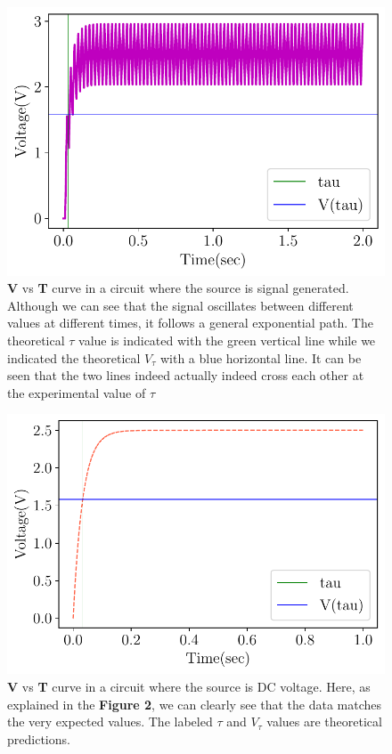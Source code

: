 \documentclass[twocolumn]{article}\usepackage[english]{babel}
\begin{document}
\begin{figure}
\includegraphics[width=\linewidth]{images/v2/Signal_Generated_RC_Circuit_Plot.pdf}
\caption{\textbf{V} vs \textbf{T} curve in a circuit where the source is signal generated. Although we can see that the signal oscillates between different values at different times, it follows a general exponential path. The theoretical $\tau$ value is indicated with the green vertical line while we indicated the theoretical $V_\tau$ with a blue horizontal line. It can be seen that the two lines indeed actually indeed cross each other at the experimental value of $\tau$}
  \label{fig:Signal RC Voltage}
\end{figure}

\begin{figure}
\includegraphics[width=\linewidth]{images/v2/RC_Circuit_Plot.pdf}
\caption{\textbf{V} vs \textbf{T} curve in a circuit where the source is DC voltage. Here, as explained in the \textbf{Figure 2}, we can clearly see that the data matches the very expected values. The labeled \textbf{$\tau$} and \textbf{$V_\tau$} values are theoretical predictions.}
  \label{fig:DC RC Voltage}
\end{figure}
\end{document}

